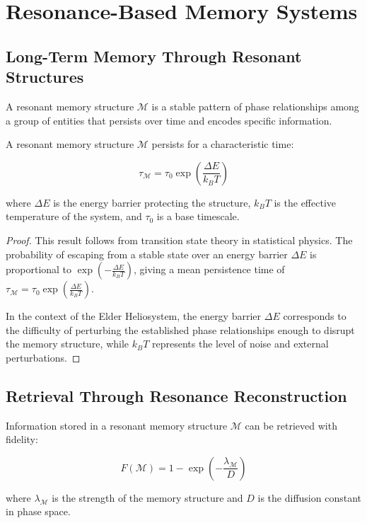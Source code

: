 \section{Resonance-Based Memory Systems}

\subsection{Long-Term Memory Through Resonant Structures}

\begin{definition}
A resonant memory structure $\mathcal{M}$ is a stable pattern of phase relationships among a group of entities that persists over time and encodes specific information.
\end{definition}

\begin{theorem}
A resonant memory structure $\mathcal{M}$ persists for a characteristic time:

\begin{equation}
\tau_{\mathcal{M}} = \tau_0 \exp\left(\frac{\Delta E}{k_B T}\right)
\end{equation}

where $\Delta E$ is the energy barrier protecting the structure, $k_B T$ is the effective temperature of the system, and $\tau_0$ is a base timescale.
\end{theorem}

\begin{proof}
This result follows from transition state theory in statistical physics. The probability of escaping from a stable state over an energy barrier $\Delta E$ is proportional to $\exp\left(-\frac{\Delta E}{k_B T}\right)$, giving a mean persistence time of $\tau_{\mathcal{M}} = \tau_0 \exp\left(\frac{\Delta E}{k_B T}\right)$.

In the context of the Elder Heliosystem, the energy barrier $\Delta E$ corresponds to the difficulty of perturbing the established phase relationships enough to disrupt the memory structure, while $k_B T$ represents the level of noise and external perturbations.
\end{proof}

\subsection{Retrieval Through Resonance Reconstruction}

\begin{theorem}
Information stored in a resonant memory structure $\mathcal{M}$ can be retrieved with fidelity:

\begin{equation}
F(\mathcal{M}) = 1 - \exp\left(-\frac{\lambda_{\mathcal{M}}}{D}\right)
\end{equation}

where $\lambda_{\mathcal{M}}$ is the strength of the memory structure and $D$ is the diffusion constant in phase space.
\end{theorem}

